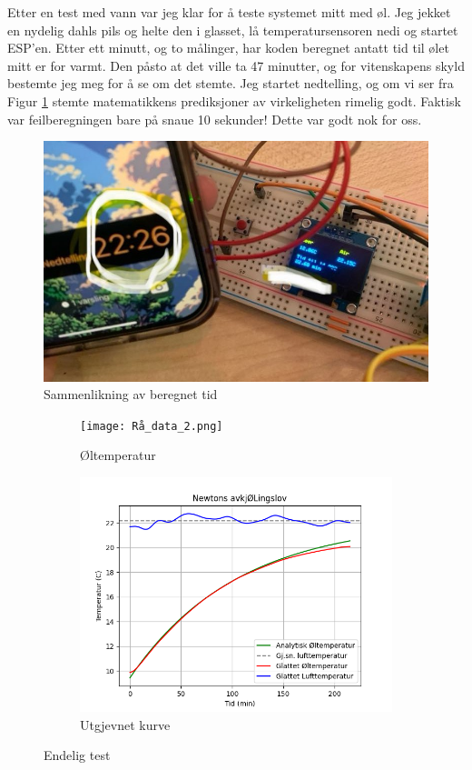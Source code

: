 \documentclass{article}
\begin{document}
Etter en test med vann var jeg klar for å teste systemet mitt med øl. Jeg jekket en nydelig dahls pils og helte den i glasset, lå temperatursensoren nedi og startet ESP'en. Etter ett minutt, og to målinger, har koden beregnet antatt tid til ølet mitt er for varmt. Den påsto at det ville ta 47 minutter, og for vitenskapens skyld bestemte jeg meg for å se om det stemte. Jeg startet nedtelling, og om vi ser fra Figur \ref{fig:tid_sammenlikn} stemte matematikkens prediksjoner av virkeligheten rimelig godt. Faktisk var feilberegningen bare på snaue 10 sekunder! Dette var godt nok for oss.
\newline
\begin{figure}[h!]
    \centering
    \includegraphics[width=0.7\linewidth]{tid_sammenlikning.jpg}
    \caption{Sammenlikning av beregnet tid}
    \label{fig:tid_sammenlikn}
\end{figure}
\newpage
\begin{figure}[h!]
    \centering
    \begin{subfigure}[b]{0.45\textwidth}
       \centering
        \texttt{[image: Rå\_data\_2.png]}
        \caption{Øltemperatur}
        \label{fig:dahls_test}
    \end{subfigure}
    \hfill
    \begin{subfigure}[b]{0.45\textwidth}
        \centering
        \includegraphics[width=\textwidth]{Glattet_data_2.png}
        \caption{Utgjevnet kurve}
        \label{fig:glattet_dahls}
    \end{subfigure}
    \caption{Endelig test}
\end{figure}
\end{document}
